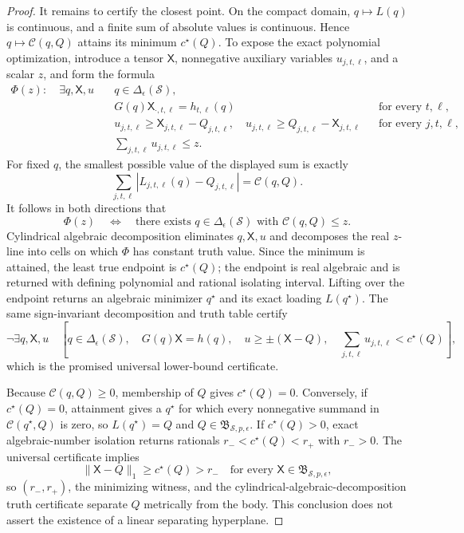 \documentclass{article}
\begin{document}
\begin{proof}
It remains to certify the closest point.  On the compact domain, \(q\mapsto L(q)\) is continuous, and a finite sum of absolute values is continuous.  Hence \(q\mapsto\mathcal C(q,Q)\) attains its minimum \(c^{\star}(Q)\).  To expose the exact polynomial optimization, introduce a tensor \(\mathsf X\), nonnegative auxiliary variables \(u_{j,t,\ell}\), and a scalar \(z\), and form the formula
\[
\begin{aligned}
 \Phi(z):\quad \exists q,\mathsf X,u\quad
 &q\in\Delta_{\epsilon}(\mathcal S),\\
 &G(q)\mathsf X_{\cdot,t,\ell}=h_{t,\ell}(q)
       &&\text{for every }t,\ell,\\
 &u_{j,t,\ell}\geq \mathsf X_{j,t,\ell}-Q_{j,t,\ell},\quad
  u_{j,t,\ell}\geq Q_{j,t,\ell}-\mathsf X_{j,t,\ell}
       &&\text{for every }j,t,\ell,\\
 &\sum_{j,t,\ell}u_{j,t,\ell}\leq z.
\end{aligned}
\]
For fixed \(q\), the smallest possible value of the displayed sum is exactly
\[
 \sum_{j,t,\ell}|L_{j,t,\ell}(q)-Q_{j,t,\ell}|
 =\mathcal C(q,Q).
\]
It follows in both directions that
\[
 \Phi(z)\quad\Longleftrightarrow\quad
 \text{there exists }q\in\Delta_{\epsilon}(\mathcal S)
 \text{ with }\mathcal C(q,Q)\leq z.
\]
Cylindrical algebraic decomposition eliminates \(q,\mathsf X,u\) and decomposes the real \(z\)-line into cells on which \(\Phi\) has constant truth value.  Since the minimum is attained, the least true endpoint is \(c^{\star}(Q)\); the endpoint is real algebraic and is returned with defining polynomial and rational isolating interval.  Lifting over the endpoint returns an algebraic minimizer \(q^{\star}\) and its exact loading \(L(q^{\star})\).  The same sign-invariant decomposition and truth table certify
\[
 \neg\exists q,\mathsf X,u\quad
 \left[
  q\in\Delta_{\epsilon}(\mathcal S),\quad
  G(q)\mathsf X=h(q),\quad
  u\geq\pm(\mathsf X-Q),\quad
  \sum_{j,t,\ell}u_{j,t,\ell}<c^{\star}(Q)
 \right],
\]
which is the promised universal lower-bound certificate.

Because \(\mathcal C(q,Q)\geq0\), membership of \(Q\) gives \(c^{\star}(Q)=0\).  Conversely, if \(c^{\star}(Q)=0\), attainment gives a \(q^{\star}\) for which every nonnegative summand in \(\mathcal C(q^{\star},Q)\) is zero, so \(L(q^{\star})=Q\) and \(Q\in\mathfrak B_{\mathcal S,p,\epsilon}\).  If \(c^{\star}(Q)>0\), exact algebraic-number isolation returns rationals \(r_-<c^{\star}(Q)<r_+\) with \(r_->0\).  The universal certificate implies
\[
 \lVert \mathsf X-Q\rVert_1\geq c^{\star}(Q)>r_-
 \quad\text{for every }\mathsf X\in\mathfrak B_{\mathcal S,p,\epsilon},
\]
so \((r_-,r_+)\), the minimizing witness, and the cylindrical-algebraic-decomposition truth certificate separate \(Q\) metrically from the body.  This conclusion does not assert the existence of a linear separating hyperplane.


\end{proof}
\end{document}
